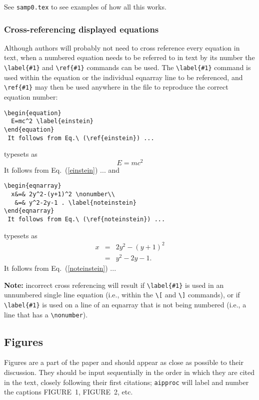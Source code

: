 See \verb+samp0.tex+ to see examples of how all this works.

\subsubsection{Cross-referencing displayed equations}

Although authors will probably not need to cross reference every equation
in text, when a
numbered equation needs to be referred to in text by its number the
\verb+\label{#1}+ and \verb+\ref{#1}+ commands can be used. The
\verb+\label{#1}+ command is used within the equation or the individual
eqnarray line to be referenced, and \verb+\ref{#1}+ may then be used
anywhere in the file to reproduce the correct equation number:
\se\begin{verbatim}
\begin{equation}
  E=mc^2 \label{einstein}
\end{equation}
 It follows from Eq.\ (\ref{einstein}) ...
\end{verbatim} \ee
\noindent typesets as
\se\begin{equation}
E=mc^2 \label{einstein}
\end{equation}
 It follows from Eq.\ (\ref{einstein}) ...\ee
\noindent and
\se\begin{verbatim}
\begin{eqnarray}
  x&=& 2y^2-(y+1)^2 \nonumber\\
   &=& y^2-2y-1 . \label{noteinstein}
\end{eqnarray}
 It follows from Eq.\ (\ref{noteinstein}) ...
\end{verbatim} \ee
\noindent typesets as
\se\begin{eqnarray}
 x&=& 2y^2-(y+1)^2 \nonumber\\
 &=& y^2-2y-1 . \label{noteinstein}
\end{eqnarray}
 It follows from Eq.\ (\ref{noteinstein}) ...\ee


{\bf Note:} incorrect cross referencing will result if \verb+\label{#1}+ is
used in an unnumbered single line equation (i.e., within the \verb+\[+ and
\verb+\]+ commands), or if \verb+\label{#1}+ is used on a line of an
eqnarray that is not being numbered (i.e., a line that has a
\verb+\nonumber+).

\subsection{Figures}

Figures are a part of the paper and should appear as close as possible to
their discussion. They should be input sequentially in the order in which they
are cited in the text, closely following their first citations; \verb+aipproc+
will label and number the captions FIGURE~1, FIGURE~2, etc.


